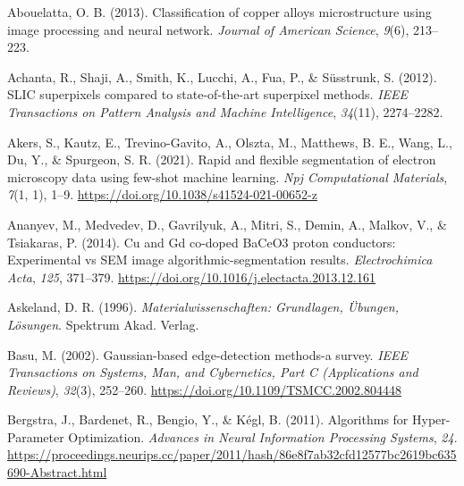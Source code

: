 \documentclass[
  12pt,
]{book}
\newlength{\cslhangindent}
\newlength{\cslentryspacingunit} %
\newenvironment{CSLReferences}[2] %
 {%
  \setlength{\parindent}{0pt}
  \ifodd #1
  \let\oldpar\par
  \def\par{\hangindent=\cslhangindent\oldpar}
  \fi
  \setlength{\parskip}{#2\cslentryspacingunit}
 }%
 {}
\begin{document}
\hypertarget{refs}{}
\begin{CSLReferences}{1}{0}
\leavevmode{}%
Abouelatta, O. B. (2013). Classification of copper alloys microstructure using image processing and neural network. \emph{Journal of American Science}, \emph{9}(6), 213--223.

\leavevmode{}%
Achanta, R., Shaji, A., Smith, K., Lucchi, A., Fua, P., \& Süsstrunk, S. (2012). {SLIC} superpixels compared to state-of-the-art superpixel methods. \emph{IEEE Transactions on Pattern Analysis and Machine Intelligence}, \emph{34}(11), 2274--2282.

\leavevmode{}%
Akers, S., Kautz, E., Trevino-Gavito, A., Olszta, M., Matthews, B. E., Wang, L., Du, Y., \& Spurgeon, S. R. (2021). Rapid and flexible segmentation of electron microscopy data using few-shot machine learning. \emph{Npj Computational Materials}, \emph{7}(1, 1), 1--9. \url{https://doi.org/10.1038/s41524-021-00652-z}

\leavevmode{}%
Ananyev, M., Medvedev, D., Gavrilyuk, A., Mitri, S., Demin, A., Malkov, V., \& Tsiakaras, P. (2014). Cu and {Gd} co-doped {BaCeO3} proton conductors: {Experimental} vs {SEM} image algorithmic-segmentation results. \emph{Electrochimica Acta}, \emph{125}, 371--379. \url{https://doi.org/10.1016/j.electacta.2013.12.161}

\leavevmode{}%
Askeland, D. R. (1996). \emph{Materialwissenschaften: {Grundlagen}, {Übungen}, {Lösungen}}. {Spektrum Akad. Verlag}.

\leavevmode{}%
Basu, M. (2002). Gaussian-based edge-detection methods-a survey. \emph{IEEE Transactions on Systems, Man, and Cybernetics, Part C (Applications and Reviews)}, \emph{32}(3), 252--260. \url{https://doi.org/10.1109/TSMCC.2002.804448}

\leavevmode{}%
Bergstra, J., Bardenet, R., Bengio, Y., \& Kégl, B. (2011). Algorithms for {Hyper-Parameter Optimization}. \emph{Advances in {Neural Information Processing Systems}}, \emph{24}. \url{https://proceedings.neurips.cc/paper/2011/hash/86e8f7ab32cfd12577bc2619bc635690-Abstract.html}


\end{CSLReferences}
\end{document}
